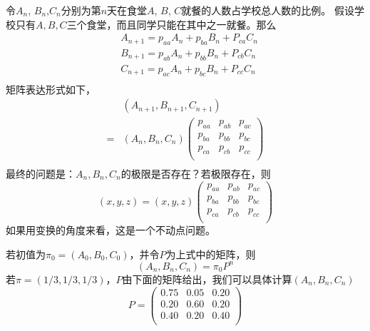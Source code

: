 令$A_n$, $B_n$,$C_n$分别为第$n$天在食堂$A$, $B$, $C$就餐的人数占学校总人数的比例。
假设学校只有$A,B,C$三个食堂，而且同学只能在其中之一就餐。那么
$$
\begin{aligned}
   & A_{n+1}=p_{aa}A_{n}+p_{ba}B_{n}+P_{ca}C_{n}\\
   & B_{n+1}=p_{ab}A_{n}+p_{bb}B_{n}+P_{cb}C_{n}\\
   & C_{n+1}=p_{ac}A_{n}+p_{bc}B_{n}+P_{cc}C_{n}\\
\end{aligned}
$$
矩阵表达形式如下，
$$
\begin{aligned}
& (A_{n+1}, B_{n+1}, C_{n+1})\\
=&(A_{n},B_{n},C_{n})
\left(
\begin{array}{ccc}
  p_{aa} & p_{ab} & p_{ac}\\
  p_{ba} & p_{bb} & p_{bc}\\
  p_{ca} & p_{cb} & p_{cc}\\
\end{array}
\right)\\
\end{aligned}
$$
最终的问题是：$A_n,B_n,C_n$的极限是否存在？若极限存在，则
$$
(x,y,z)
=(x,y,z)
\left(
\begin{array}{ccc}
  p_{aa} & p_{ab} & p_{ac}\\
  p_{ba} & p_{bb} & p_{bc}\\
  p_{ca} & p_{cb} & p_{cc}\\
\end{array}
\right)
$$
如果用变换的角度来看，这是一个不动点问题。

若初值为$\pi_0=(A_0,B_0,C_0)$，并令$P$为上式中的矩阵，则
$$
(A_{n},B_{n},C_{n})=\pi_{0} P^{n}
$$
若$\pi=(1/3,1/3,1/3)$，$P$由下面的矩阵给出，我们可以具体计算$(A_n,B_n,C_n)$
$$
P=\left(
 \begin{array}{ccc}
   0.75 & 0.05 & 0.20\\
   0.20 & 0.60 & 0.20\\
   0.40 & 0.20 & 0.40\\
 \end{array}
\right)
$$

